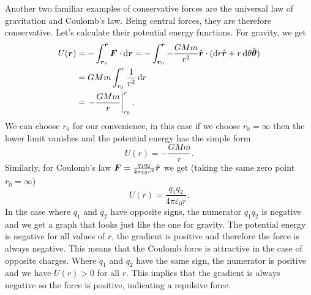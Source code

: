 \documentclass[../classical_mechanics.tex]{subfiles}
\begin{document}
        Another two familiar examples of conservative forces are the universal law of gravitation and Coulomb's law.
        Being central forces, they are therefore conservative.
        Let's calculate their potential energy functions.
        For gravity, we get
        \begin{align}
            U(\vec{r})&=-\int_{\vec{r}_0}^{\vec{r}}\vec{F}\cdot\dd{\vec{r}}=-\int_{\vec{r}_0}^{\vec{r}}-\frac{GMm}{r^2}\uvec{r}\cdot(\dd{r}\uvec{r}+r\dd{\theta}\uvec{\theta})\\
            &=GMm\int_{r_0}^{r}\frac{1}{r^2}\dd{r}\\
            &=\left.-\frac{GMm}{r}\right|_{r_0}^{r}.
        \end{align}
        We can choose $r_0$ for our convenience, in this case if we choose $r_0=\infty$ then the lower limit vanishes and the potential energy has the simple form
        \begin{equation}
            U(r)=-\frac{GMm}{r}.
        \end{equation}
        Similarly, for Coulomb's law $\boldsymbol{F}=\frac{q_1q_2}{4\pi\varepsilon_0r^2}\hat{\boldsymbol{r}}$ we get (taking the same zero point $r_0=\infty$)
        \begin{equation}
            U(r)=\frac{q_1q_2}{4\pi\varepsilon_0r}.
        \end{equation}
        In the case where $q_1$ and $q_2$ have opposite signs, the numerator $q_1q_2$ is negative and we get a graph that looks just like the one for gravity.
        The potential energy is negative for all values of $r$, the gradient is positive and therefore the force is always negative.
        This means that the Coulomb force is attractive in the case of opposite charges.
        Where $q_1$ and $q_2$ have the same sign, the numerator is positive and we have $U(r)>0$ for all $r$.
        This implies that the gradient is always negative so the force is positive, indicating a repulsive force.
\end{document}
